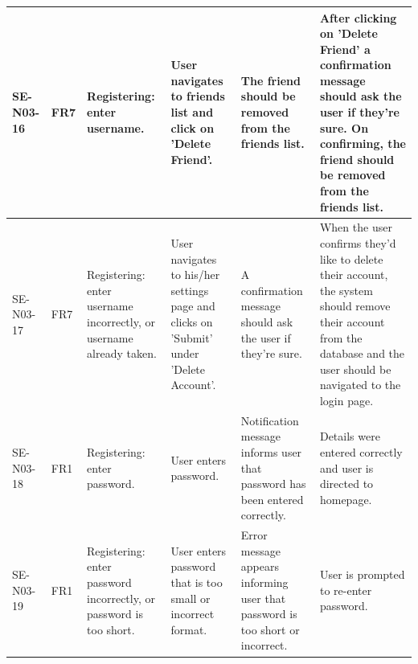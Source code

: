 \documentclass[a4paper]{article}
\begin{document}
\begin{landscape}
\begin{center}
\begin{tabular}{| l | l | p{3cm} | p{3cm} | p{5cm} | p{7cm} |}
	\hline
	SE-N03-16 & FR7 & Registering: enter username. & User navigates to friends list and click on 'Delete Friend'. & The friend should be removed from the friends list. & After clicking on 'Delete Friend' a confirmation message should ask the user if they're sure. On confirming, the friend should be removed from the friends list.\\
	\hline
	SE-N03-17 & FR7 & Registering: enter username incorrectly, or username already taken. & User navigates to his/her settings page and clicks on 'Submit' under 'Delete Account'. & A confirmation message should ask the user if they're sure. & When the user confirms they'd like to delete their account, the system should remove their account from the database and the user should be navigated to the login page.\\
	\hline
	SE-N03-18 & FR1 & Registering: enter password. &  User enters password. & Notification message informs user that password has been entered correctly. & Details were entered correctly and user is directed to homepage.\\
	\hline
	SE-N03-19 & FR1 & Registering: enter password incorrectly, or password is too short. & User enters password that is too small or incorrect format. & Error message appears informing user that password is too short or incorrect. & User is prompted to re-enter password.\\
	\hline
\end{tabular}
\end{center}

\clearpage


\end{landscape}
\end{document}
